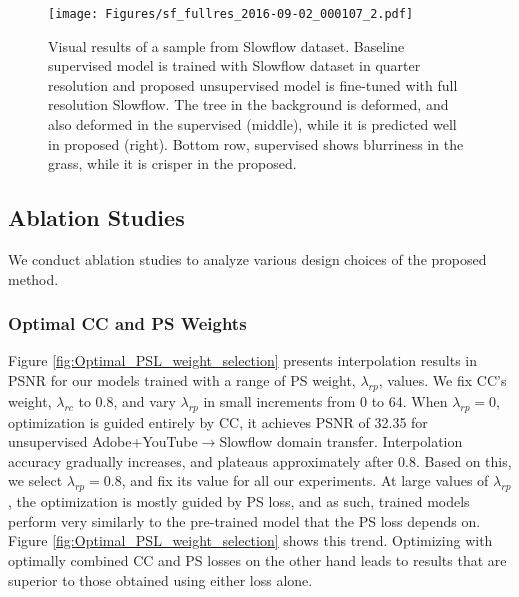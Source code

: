 \documentclass[10pt,twocolumn,letterpaper]{article}
\renewcommand{\textrightarrow}{$\rightarrow$}
\begin{document}
\begin{figure}[t]
    \centering
    \texttt{[image: Figures/sf\_fullres\_2016-09-02\_000107\_2.pdf]}
    \caption{Visual results of a sample from Slowflow dataset. Baseline supervised model is trained with Slowflow dataset in quarter resolution and proposed unsupervised model is fine-tuned with full resolution Slowflow. The tree in the background is deformed, and also deformed in the supervised (middle), while it is predicted well in proposed (right). Bottom row, supervised shows blurriness in the grass, while it is crisper in the proposed.}
    \label{fig:Sf_spatial_transfer}
\end{figure}



\subsection{Ablation Studies}

We conduct ablation studies to analyze various design choices of the proposed method. 
\subsubsection{Optimal CC and PS Weights}\label{optimal_PSL_weight}
Figure \ref{fig:Optimal_PSL_weight_selection} presents interpolation results in PSNR for our models trained with a range of PS weight, $\lambda_{rp}$, values. We fix CC's weight, $\lambda_{rc}$ to 0.8, and vary $\lambda_{rp}$ in small increments from 0 to 64. When $\lambda_{rp}=0$, optimization is guided entirely by CC, it achieves PSNR of 32.35 for unsupervised Adobe+YouTube\textrightarrow Slowflow domain transfer. Interpolation accuracy gradually increases, and plateaus approximately after 0.8. Based on this, we select $\lambda_{rp}=0.8$, and fix its value for all our experiments. At large values of $\lambda_{rp}$, the optimization is mostly guided by PS loss, and as such, trained models perform very similarly to the pre-trained model that the PS loss depends on. Figure \ref{fig:Optimal_PSL_weight_selection} shows this trend. Optimizing with optimally combined CC and PS losses on the other hand leads to results that are superior to those obtained using either loss alone. 

 
\end{document}
